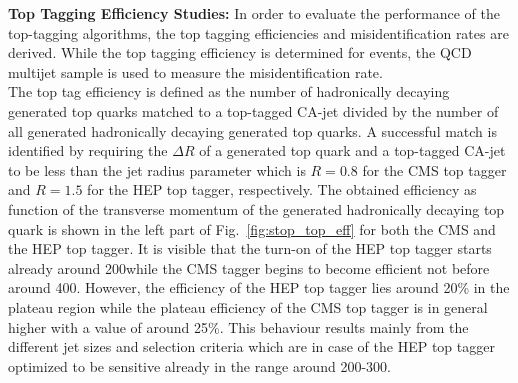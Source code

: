 \begin{description}
\item {\textbf{Top Tagging Efficiency Studies:}} In order to evaluate the performance of the top-tagging algorithms, the top tagging efficiencies and misidentification rates are derived. While the top tagging efficiency is determined for \ttbar events, the QCD multijet sample is used to measure the misidentification rate. \\
The top tag efficiency is defined as the number of hadronically decaying generated top quarks matched to a top-tagged CA-jet divided by the number of all generated hadronically decaying generated top quarks. A successful match is identified by requiring the $\Delta R$ of a generated top quark and a top-tagged CA-jet to be less than the jet radius parameter which is $R=0.8$ for the CMS top tagger and $R=1.5$ for the HEP top tagger, respectively. The obtained efficiency as function of the transverse momentum of the generated hadronically decaying top quark is shown in the left part of Fig.~\ref{fig:stop_top_eff} for both the CMS and the HEP top tagger. It is visible that the turn-on of the HEP top tagger starts already around 200\gev while the CMS tagger begins to become efficient not before around 400\gev. However, the efficiency of the HEP top tagger lies around 20\% in the plateau region while the plateau efficiency of the CMS top tagger is in general higher with a value of around 25\%. This behaviour results mainly from the different jet sizes and selection criteria which are in case of the HEP top tagger optimized to be sensitive already in the \pt range around 200-300\gev.\\
\begin{figure}[!t]
  \centering
{}
\end{figure}
\end{description}
